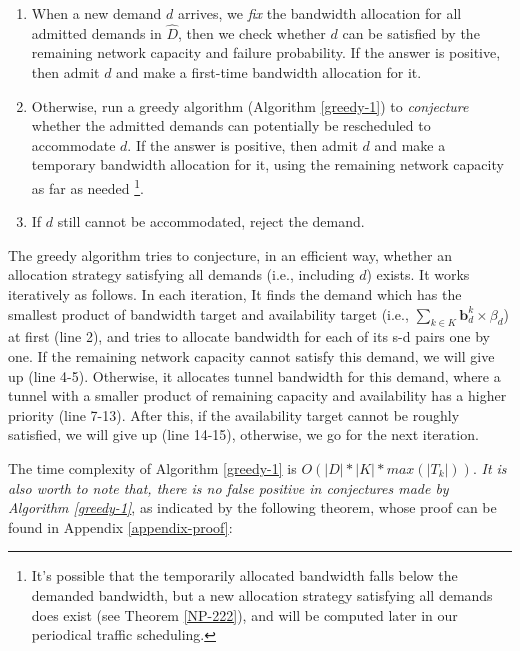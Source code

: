 \documentclass[sigconf]{acmart}
\begin{document}
\begin{enumerate}
    \item When a new demand $d$ arrives, we \textit{fix} the bandwidth allocation for all admitted demands in $\hat{D}$, then we check whether $d$ can be satisfied by the remaining network capacity and failure  probability. If the answer is positive, then admit $d$ and make a first-time bandwidth allocation for it.
    \item Otherwise, run a greedy algorithm (Algorithm \ref{greedy-1}) to \textit{conjecture} whether the admitted demands can potentially be rescheduled to accommodate $d$. If the answer is positive, then admit $d$ and make a temporary bandwidth allocation for it, using the remaining network capacity as far as needed \footnote{It's possible that the temporarily allocated bandwidth falls below the demanded bandwidth, but a new allocation strategy satisfying all demands does exist (see Theorem \ref{NP-222}), and will be computed later in our periodical traffic scheduling.}. 
	\item If $d$ still cannot be accommodated, reject the demand.
\end{enumerate}

%
The greedy algorithm tries to conjecture, in an efficient way, whether an allocation strategy satisfying all demands (i.e., including $d$) exists. It works iteratively as follows. In each iteration, 
It finds the demand which has the smallest product of bandwidth target and availability target (i.e., $\sum_{k \in K}\mathbf{b}_d^k \times \beta_d$) at first (line 2), 
and tries to allocate bandwidth for each of its s-d pairs one by one. 
If the remaining network capacity cannot satisfy this demand, we will give up (line 4-5). 
Otherwise, it allocates tunnel bandwidth for this demand, where a tunnel with a smaller product of 
remaining capacity and availability has a higher priority (line 7-13). 
After this, if the availability target cannot be roughly satisfied, we will give up  (line 14-15), 
otherwise, we go for the next iteration.

The time complexity of Algorithm \ref{greedy-1} is $O(|D|*|K|*max(|T_k|))$. 
\textit{It is also worth to note that, there is no false positive in conjectures made by Algorithm \ref{greedy-1}}, 
as indicated by the following theorem, whose proof can be found in Appendix \ref{appendix-proof}:
\end{document}
